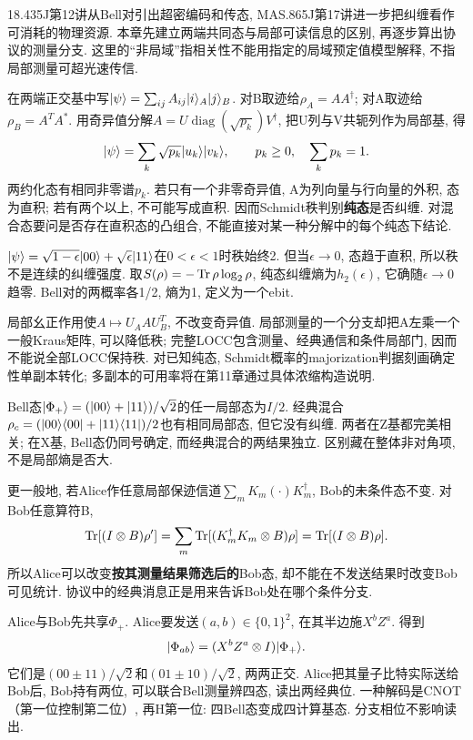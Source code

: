 18.435J第12讲从Bell对引出超密编码和传态, MAS.865J第17讲进一步把纠缠看作可消耗的物理资源. 本章先建立两端共同态与局部可读信息的区别, 再逐步算出协议的测量分支. 这里的“非局域”指相关性不能用指定的局域预定值模型解释, 不指局部测量可超光速传信.

在两端正交基中写$\lvert \psi\rangle=\sum_{ij}A_{ij}\lvert i\rangle_A\lvert j\rangle_B$. 对B取迹给$\rho_A=AA^\dagger$; 对A取迹给$\rho_B=A^T A^*$. 用奇异值分解$A=U\operatorname{diag}(\sqrt{p_k})V^\dagger$, 把U列与V共轭列作为局部基, 得
\[\lvert \psi\rangle=\sum_k\sqrt{p_k}\lvert u_k\rangle\lvert v_k\rangle,\qquad p_k\ge0,\quad\sum_kp_k=1.\]
两约化态有相同非零谱$p_k$. 若只有一个非零奇异值, A为列向量与行向量的外积, 态为直积; 若有两个以上, 不可能写成直积. 因而Schmidt秩判别\textbf{纯态}是否纠缠. 对混合态要问是否存在直积态的凸组合, 不能直接对某一种分解中的每个纯态下结论.

\begin{example}$\lvert \psi\rangle=\sqrt{1-\epsilon}\lvert 00\rangle+\sqrt\epsilon\lvert 11\rangle$在$0<\epsilon<1$时秩始终2. 但当$\epsilon\to0$, 态趋于直积, 所以秩不是连续的纠缠强度. 取$S(\rho)=-\operatorname{Tr}\rho\log_2\rho$, 纯态纠缠熵为$h_2(\epsilon)$, 它确随$\epsilon\to0$趋零. Bell对的两概率各1/2, 熵为1, 定义为一个ebit.\end{example}

局部幺正作用使$A\mapsto U_A A U_B^T$, 不改变奇异值. 局部测量的一个分支却把A左乘一个一般Kraus矩阵, 可以降低秩; 完整LOCC包含测量、经典通信和条件局部门, 因而不能说全部LOCC保持秩. 对已知纯态, Schmidt概率的majorization判据刻画确定性单副本转化; 多副本的可用率将在第11章通过具体浓缩构造说明.

Bell态$\lvert \Phi_+\rangle=(\lvert 00\rangle+\lvert 11\rangle)/\sqrt2$的任一局部态为$I/2$. 经典混合$\rho_c=(\lvert 00\rangle\langle 00\rvert+\lvert 11\rangle\langle 11\rvert)/2$也有相同局部态, 但它没有纠缠. 两者在Z基都完美相关; 在X基, Bell态仍同号确定, 而经典混合的两结果独立. 区别藏在整体非对角项, 不是局部熵是否大.

更一般地, 若Alice作任意局部保迹信道$\sum_mK_m(\cdot)K_m^\dagger$, Bob的未条件态不变. 对Bob任意算符B,
\[\operatorname{Tr}[(I\otimes B)\rho']=\sum_m\operatorname{Tr}[(K_m^\dagger K_m\otimes B)\rho]=\operatorname{Tr}[(I\otimes B)\rho].\]
所以Alice可以改变\textbf{按其测量结果筛选后的}Bob态, 却不能在不发送结果时改变Bob可见统计. 协议中的经典消息正是用来告诉Bob处在哪个条件分支.

Alice与Bob先共享$\Phi_+$. Alice要发送$(a,b)\in\{0,1\}^2$, 在其半边施$X^bZ^a$. 得到
\[\lvert \Phi_{ab}\rangle=(X^bZ^a\otimes I)\lvert \Phi_+\rangle.\]
它们是$(00\pm11)/\sqrt2$和$(01\pm10)/\sqrt2$, 两两正交. Alice把其量子比特实际送给Bob后, Bob持有两位, 可以联合Bell测量辨四态, 读出两经典位. 一种解码是CNOT（第一位控制第二位）, 再H第一位: 四Bell态变成四计算基态. 分支相位不影响读出.

